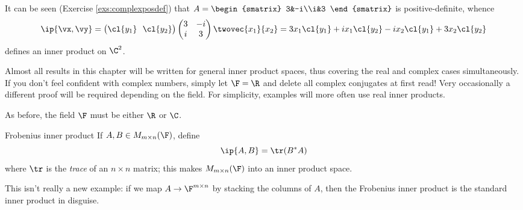 \begin{example}{}{}
It can be seen (Exercise \ref{exs:complexposdef}) that $A=\begin{smatrix}
3&-i\\i&3
\end{smatrix}$ is positive-definite, whence
\[\ip{\vx,\vy}=\bigl(\cl{y_1}\ \ \cl{y_2}\bigr)
\begin{pmatrix}
3&-i\\i&3
\end{pmatrix}
\twovec{x_1}{x_2} =
3x_1\cl{y_1}+ix_1\cl{y_2}-ix_2\cl{y_1}+3x_2\cl{y_2}\]
defines an inner product on $\C^2$.
\end{example}

Almost all results in this chapter will be written for general inner product spaces, thus covering the real and complex cases simultaneously. If you don't feel confident with complex numbers, simply let $\F=\R$ and delete all complex conjugates at first read! Very occasionally a different proof will be required depending on the field. For simplicity, examples will more often use real inner products. 

\goodbreak

 As before, the field $\F$ must be either $\R$ or $\C$.

\begin{defn}{Frobenius inner product}{}
If $A,B\in M_{m\times n}(\F)$, define
\[\ip{A,B}=\tr(B^*A)\]
where $\tr$ is the \emph{trace} of an $n\times n$ matrix; this makes $M_{m\times n}(\F)$ into an inner product space.
\end{defn}

This isn't really a new example: if we map $A\to\F^{m\times n}$ by stacking the columns of $A$, then the Frobenius inner product is the standard inner product in disguise.


